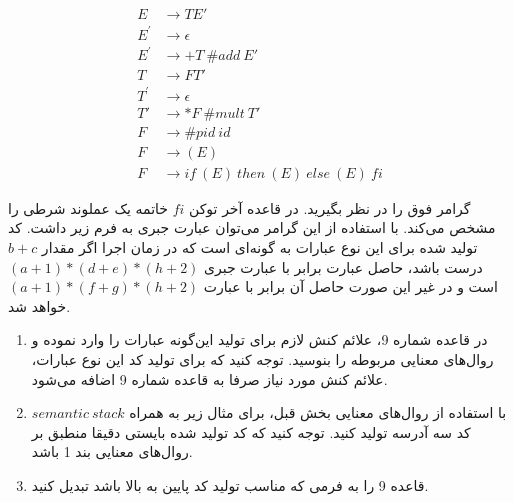 \documentclass[10pt,a4paper]{article}
\begin{document}



\begin{align*}
E&\rightarrow TE' \\
E^{'}&\rightarrow \epsilon\\
E^{'}&\rightarrow +T \ \# add \ E'\\
T &\rightarrow FT'\\
T^{'}&\rightarrow \epsilon\\
T' &\rightarrow *F \ \# mult \ T'\\
F &\rightarrow  \# pid \ id\\
F &\rightarrow (E)\\
F &\rightarrow if \ (E) \ then \ (E) \ else \ (E) \ fi
\end{align*}

گرامر فوق را در نظر بگیرید. در قاعده آخر توکن $fi$ خاتمه یک عملوند شرطی را مشخص می‌کند. با استفاده از این گرامر می‌توان عبارت جبری به فرم زیر داشت. کد تولید شده برای این نوع عبارات به گونه‌ای است که در زمان اجرا اگر مقدار $b+c$ درست باشد، حاصل عبارت برابر با عبارت جبری $(a+1)*(d+e)*(h+2)$ است و در غیر این صورت حاصل آن برابر با عبارت $(a+1)*(f+g)*(h+2)$ خواهد شد.

\begin{enumerate}
	\item در قاعده شماره 9، علائم کنش لازم برای تولید این‌گونه عبارات را وارد نموده و روال‌های معنایی مربوطه را بنوسید.
	توجه کنید که برای تولید کد این نوع عبارات، علائم کنش مورد نیاز صرفا به قاعده شماره 9 اضافه می‌شود.
	
	\item با استفاده از روال‌های معنایی بخش قبل، برای مثال زیر  به همراه $semantic \ stack$ کد سه آدرسه تولید کنید.
	توجه کنید که کد تولید شده بایستی دقیقا منطبق بر روال‌های معنایی بند 1 باشد.
	\item 
	قاعده 9 را به فرمی که مناسب تولید کد پایین به بالا باشد تبدیل کنید.
\end{enumerate}
\end{document}
